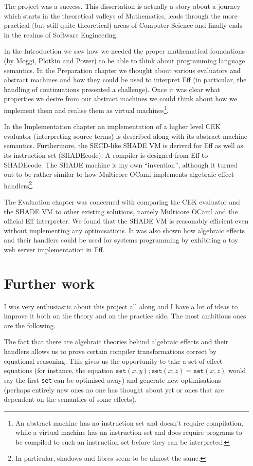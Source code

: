 \documentclass[class=article, crop=false]{standalone}
\begin{document}
The project was a success. This dissertation is actually a story about a journey
which starts in the theoretical valleys of Mathematics, leads through the more practical
(but still quite theoretical) areas of Computer Science and finally ends in the realms of Software
Engineering.

In the Introduction we saw how we needed the proper mathematical foundations (by Moggi, Plotkin and Power) to be able to think
about programming language semantics. In the Preparation chapter we thought about various evaluators and abstract machines and
how they could be used to interpret Eff (in particular, the handling of continuations presented a challenge). Once it was clear
what properties we desire from our abstract machines we could think about how we implement them and realise them as virtual
machines\footnote{An abstract machine has no instruction set and doesn't require compilation, while a virtual machine has an
instruction set and does require programs to be compiled to such an instruction set before they can be interpreted.}.

In the Implementation chapter an implementation of a higher level CEK evaluator (interpreting source terms) is described along
with its abstract machine semantics. Furthermore, the SECD-like SHADE VM is derived for Eff as well as its instruction set
(SHADEcode). A compiler is designed from Eff to SHADEcode. The SHADE machine is my own ``invention'', although it turned out
to be rather similar to how Multicore OCaml implements algebraic effect handlers\footnote{In particular, shadows and fibres
seem to be almost the same.}.

The Evaluation chapter was concerned with comparing the CEK evaluator and the SHADE VM to other existing solutions, namely
Multicore OCaml and the official Eff interpreter. We found that the SHADE VM is reasonably efficient even without implementing
any optimisations. It was also shown how algebraic effects and their handlers
could be used for systems programming by exhibiting a toy web server implementation in Eff.

\section{Further work}

I was very enthusiastic about this project all along and I have a lot of ideas to improve it both on the theory and on the
practice side. The most ambitious ones are the following.

The fact that there are algebraic theories behind algebraic effects and their handlers allows us to prove certain
compiler transformations correct by equational reasoning. This gives us the opportunity to take a set of effect
equations (for instance, the equation $\mathtt{set}(x,y); \mathtt{set}(x,z) = \mathtt{set}(x, z)$ would say the first
\texttt{set} can be optimised away) and generate new optimisations (perhaps entirely new ones no one has thought about yet
or ones that are dependent on the semantics of some effects).
\end{document}

